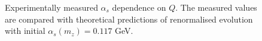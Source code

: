         \begin{figure}[b!] %
            \centering{}
            \caption[$\alpha_s$ dependence on $Q^2$.]{Experimentally measured $\alpha_s$ dependence on $Q$.
            The measured values are compared with theoretical predictions of renormalised evolution with initial $\alpha_s(m_z) = 0.117$ GeV.}
            \label{fig::alpha_q_dependence}
        \end{figure}

